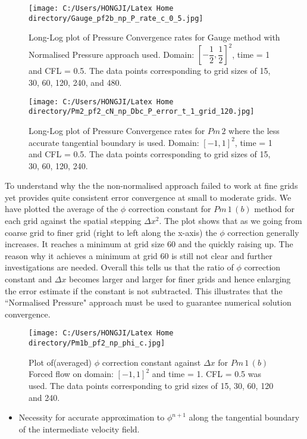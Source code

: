\begin{figure}[H]
	\centering
	\texttt{[image: C:/Users/HONGJI/Latex Home directory/Gauge\_pf2b\_np\_P\_rate\_c\_0\_5.jpg]}
	\caption{Long-Log plot of Pressure Convergence rates for Gauge method with Normalised Pressure approach used. Domain: $[-\dfrac{1}{2},\dfrac{1}{2}]^2$, time = 1 and CFL = 0.5. The data points corresponding to grid sizes of 15, 30, 60, 120, 240, and 480.}\label{fig:6.16}
\end{figure}

\begin{figure}[H]
	\centering
	\texttt{[image: C:/Users/HONGJI/Latex Home directory/Pm2\_pf2\_cN\_np\_Dbc\_P\_error\_t\_1\_grid\_120.jpg]}
	\caption{Long-Log plot of Pressure Convergence rates for $Pm\,2$ where the less accurate tangential boundary is used. Domain: $[-1,1]^2$, time = 1 and CFL = 0.5. The data points corresponding to grid sizes of 15, 30, 60, 120, 240.}\label{fig:6.16}
\end{figure}

\newpage
To understand why the the non-normalised approach failed to work at fine grids yet provides quite consistent error convergence at small to moderate grids. We have plotted the average of the $\phi$ correction constant for $Pm\,1\,(b)$ method for each grid against the spatial stepping $\Delta x^2$. The plot shows that as we going from coarse grid to finer grid (right to left along the x-axis) the $\phi$ correction generally increases. It reaches a minimum at grid size 60 and the quickly raising up. The reason why it achieves a minimum at grid 60 is still not clear and further investigations are needed. Overall this tells us that the ratio of $\phi$ correction constant and $\Delta x$ becomes larger and larger for finer grids and hence enlarging the error estimate if the constant is not subtracted. This illustrates that the ``Normalised Pressure" approach must be used to guarantee numerical solution convergence. \\

\begin{figure}[H]
	\centering
	\texttt{[image: C:/Users/HONGJI/Latex Home directory/Pm1b\_pf2\_np\_phi\_c.jpg]}
	\caption{Plot of(averaged) $\phi$ correction constant against $\Delta x$ for $Pm\,1\,(b)$ Forced flow on domain: $[-1,1]^2$ and time = 1. CFL = 0.5 was used. The data points corresponding to grid sizes of 15, 30, 60, 120 and 240.}\label{fig:6.16}
\end{figure}

\begin{itemize}
\item Necessity for accurate approximation to $\phi^{n+1}$ along the tangential boundary of the intermediate velocity field.
\end{itemize}

